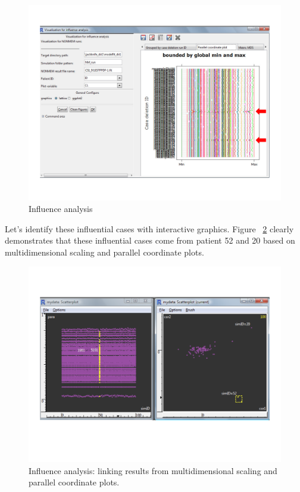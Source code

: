 \documentclass[a4paper]{article}
\begin{document}
\begin{figure}[h!tb]
\centering
\includegraphics[scale=0.6]{c4_s2_7.pdf}
\caption{Influence analysis}
\label{c4_s2_7}
\end{figure}
\newline
\newline
Let's identify these influential cases with interactive graphics. Figure ~\ref{c4_s2_8} clearly demonstrates that these influential cases come from patient 52 and 20 based on multidimensional scaling and parallel coordinate plots.
\begin{figure}[h!tb]
\centering
\includegraphics[scale=0.6]{c4_s2_8.pdf}
\caption{Influence analysis: linking results from multidimensional scaling and parallel coordinate plots.}
\label{c4_s2_8}
\end{figure}
\end{document}
